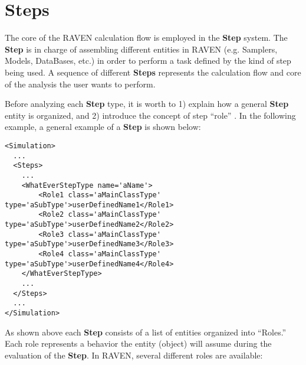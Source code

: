 \section{Steps}
\label{sec:steps}
The core of the RAVEN calculation flow is employed in the \textbf{Step} system.
%
The \textbf{Step} is in charge of assembling different entities in RAVEN (e.g.
Samplers, Models, DataBases, etc.) in order to perform a task defined by the
kind of step being used.
%
A sequence of different \textbf{Steps} represents the calculation flow and core
of the analysis the user wants to perform. 
%

Before analyzing each \textbf{Step} type, it is worth to 1) 
explain how a general \textbf{Step} entity is organized, and 2) introduce the concept of step
``role'' .
%
In the following example, a general example of a \textbf{Step} is shown below:
\begin{lstlisting}[style=XML,morekeywords={class}]
<Simulation>
  ...
  <Steps>
    ...
    <WhatEverStepType name='aName'>
        <Role1 class='aMainClassType' type='aSubType'>userDefinedName1</Role1>
        <Role2 class='aMainClassType' type='aSubType'>userDefinedName2</Role2>
        <Role3 class='aMainClassType' type='aSubType'>userDefinedName3</Role3>
        <Role4 class='aMainClassType' type='aSubType'>userDefinedName4</Role4>
    </WhatEverStepType>
    ...
  </Steps>
  ...
</Simulation>
\end{lstlisting}
As shown above each \textbf{Step} consists of
a list of entities organized into ``Roles.'' 
%
Each role represents a behavior the entity (object) will assume during the
evaluation of the \textbf{Step}.
%
In RAVEN, several different roles are available:
